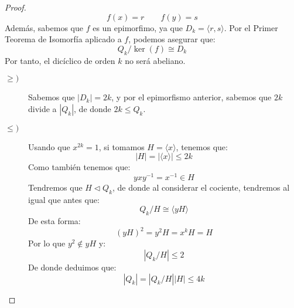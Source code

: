 \begin{ejemplo}
\begin{itemize}
\begin{proof}
                \begin{equation*}
                    f(x) = r \qquad f(y) = s
                \end{equation*}
                Además, sabemos que $f$ es un epimorfimo, ya que $D_k = \langle r,s \rangle $. Por el Primer Teorema de Isomorfía aplicado a $f$, podemos asegurar que:
                \begin{equation*}
                    Q_k/\ker(f)\cong D_k
                \end{equation*}
                Por tanto, el dicíclico de orden $k$ no será abeliano.  %

                \begin{description}
                    \item [$\geq)$] Sabemos que $|D_k| = 2k$, y por el epimorfismo anterior, sabemos que $2k$ divide a $|Q_k|$, de donde $2k\leq Q_k$.
                    \item [$\leq)$] Usando que $x^{2k} = 1$, si tomamos $H = \langle x \rangle $, tenemos que:
                        \begin{equation*}
                            |H| = |\langle x \rangle | \leq 2k
                        \end{equation*}
                        Como también tenemos que:
                        \begin{equation*}
                            yxy^{-1} = x^{-1}\in H
                        \end{equation*}
                        Tendremos que $H\lhd Q_k$, de donde al considerar el cociente, tendremos al igual que antes que:
                        \begin{equation*}
                            Q_k/H \cong \langle yH \rangle 
                        \end{equation*}
                        De esta forma:
                        \begin{equation*}
                            {(yH)}^{2} = y^2H = x^kH = H
                        \end{equation*}
                        Por lo que $y^2\notin yH$ y:
                        \begin{equation*}
                            |Q_k/H| \leq 2
                        \end{equation*}
                        De donde deduimos que:
                        \begin{equation*}
                            |Q_k| = |Q_k/H||H| \leq 4k
                        \end{equation*}
                \end{description}


\end{proof}
\end{itemize}
\end{ejemplo}
